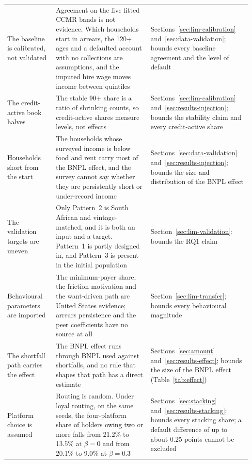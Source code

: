 \begin{longtable}{@{}L{3.1cm}L{6.5cm}L{4.45cm}@{}}
The baseline is calibrated, not validated & Agreement on the five fitted \ac{CCMR} bands is not evidence. Which households start in arrears, the 120+ ages and a defaulted account with no collections are assumptions, and the imputed hire wage moves income between quintiles & Sections~\ref{sec:lim-calibration} and~\ref{sec:data-validation}; bounds every baseline agreement and the level of default \\
\addlinespace
The credit-active book halves & The stable 90+ share is a ratio of shrinking counts, so credit-active shares measure levels, not effects & Sections~\ref{sec:lim-calibration} and~\ref{sec:results-injection}; bounds the stability claim and every credit-active share \\
\addlinespace
Households short from the start & The households whose surveyed income is below food and rent carry most of the \ac{BNPL} effect, and the survey cannot say whether they are persistently short or under-record income & Sections~\ref{sec:data-validation} and~\ref{sec:results-injection}; bounds the size and distribution of the \ac{BNPL} effect \\
\addlinespace
The validation targets are uneven & Only Pattern~2 is South African and vintage-matched, and it is both an input and a target. Pattern~1 is partly designed in, and Pattern~3 is present in the initial population & Section~\ref{sec:lim-validation}; bounds the RQ1 claim \\
\addlinespace
Behavioural parameters are imported & The minimum-payer share, the friction motivation and the want-driven path are United States evidence; arrears persistence and the peer coefficients have no source at all & Section~\ref{sec:lim-transfer}; bounds every behavioural magnitude \\
\addlinespace
The shortfall path carries the effect & The \ac{BNPL} effect runs through \ac{BNPL} used against shortfalls, and no rule that shapes that path has a direct estimate & Sections~\ref{sec:amount} and~\ref{sec:results-effect}; bounds the size of the \ac{BNPL} effect (Table~\ref{tab:effect}) \\
\addlinespace
Platform choice is assumed & Routing is random. Under loyal routing, on the same seeds, the four-platform share of holders owing two or more falls from 21.2\% to 13.5\% at $\beta = 0$ and from 20.1\% to 9.0\% at $\beta = 0.3$
& Sections~\ref{sec:stacking} and~\ref{sec:results-stacking}; bounds every stacking share; a default difference of up to about 0.25 points cannot be excluded \\

\end{longtable}
